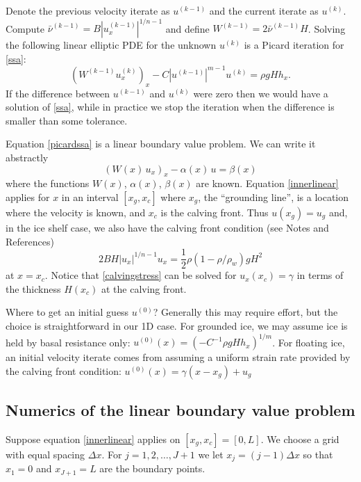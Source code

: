\documentclass[letterpaper,final,12pt,reqno]{amsart}
\begin{document}
Denote the previous velocity iterate as $u^{(k-1)}$ and the current iterate as $u^{(k)}$.  Compute $\bar \nu^{(k-1)} = B |u^{(k-1)}_x|^{1/n-1}$ and define $W^{(k-1)} = 2 \bar \nu^{(k-1)} H$.  Solving the following linear elliptic PDE for the unknown $u^{(k)}$ is a Picard iteration for \eqref{ssa}:
\begin{equation}
   \left(W^{(k-1)} u^{(k)}_x\right)_x - C |u^{(k-1)}|^{m-1} u^{(k)} = \rho g H h_x. \label{picardssa}
\end{equation}
If the difference between $u^{(k-1)}$ and $u^{(k)}$ were zero then we would have a solution of \eqref{ssa}, while in practice we stop the iteration when the difference is smaller than some tolerance.

Equation \eqref{picardssa} is a linear boundary value problem.  We can write it abstractly
\begin{equation}
  \left(W(x)\, u_x\right)_x - \alpha(x)\, u = \beta(x)  \label{innerlinear}
\end{equation}
where the functions $W(x)$, $\alpha(x)$, $\beta(x)$ are known.  Equation \eqref{innerlinear} applies for $x$ in an interval $[x_g,x_c]$ where $x_g$, the ``grounding line'', is a location where the velocity is known, and $x_c$ is the calving front.  Thus $u(x_g)=u_g$ and, in the ice shelf case, we also have the calving front condition (see Notes and References)
\begin{equation}
  2 B H |u_x|^{1/n - 1} u_x = \frac{1}{2}\rho (1-\rho/\rho_w) g H^2  \label{calvingstress}
\end{equation}
at $x=x_c$.  Notice that \eqref{calvingstress} can be solved for $u_x(x_c)=\gamma$ in terms of the thickness $H(x_c)$ at the calving front.

Where to get an initial guess $u^{(0)}$?  Generally this may require effort, but the choice is straightforward in our 1D case.  For grounded ice, we may assume ice is held by basal resistance only: $u^{(0)}(x) = \left(-C^{-1} \rho g H h_x\right)^{1/m}$.  For floating ice, an initial velocity iterate comes from assuming a uniform strain rate provided by the calving front condition: $u^{(0)}(x) = \gamma (x-x_g) + u_g$

\subsection*{Numerics of the linear boundary value problem}  Suppose equation \eqref{innerlinear} applies on $[x_g,x_c]=[0,L]$.  We choose a grid with equal spacing $\Delta x$.  For $j=1,2,\dots,J+1$ we let $x_j=(j-1)\Delta x$ so that $x_1 = 0$ and $x_{J+1} = L$ are the boundary points.
\end{document}
